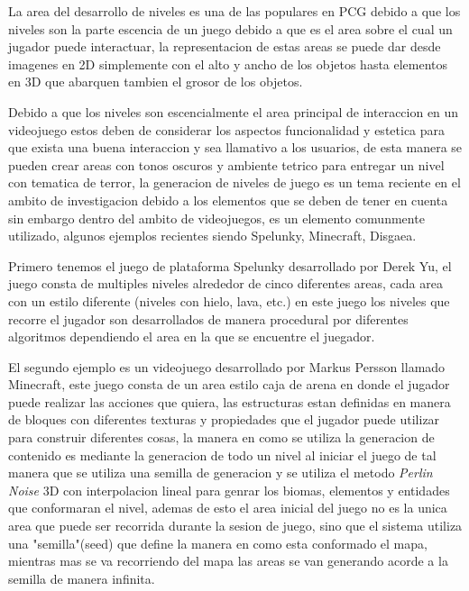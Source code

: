 La area del desarrollo de niveles es una de las populares en PCG debido a que
los niveles son la parte escencia de un juego debido a que es el area sobre el
cual un jugador puede interactuar, la representacion de estas areas se puede dar
desde imagenes en 2D simplemente con el alto y ancho de los objetos hasta
elementos en 3D que abarquen tambien el grosor de los objetos.

Debido a que los niveles son escencialmente el area principal de interaccion en
un videojuego estos deben de considerar los aspectos funcionalidad y estetica
para que exista una buena interaccion y sea llamativo a los usuarios, de esta
manera se pueden crear areas con tonos oscuros y ambiente tetrico para entregar
un nivel con tematica de terror, la generacion de niveles de juego es un tema
reciente en el ambito de investigacion debido a los elementos que se deben de
tener en cuenta sin embargo dentro del ambito de videojuegos, es un elemento
comunmente utilizado, algunos ejemplos recientes siendo Spelunky, Minecraft,
Disgaea.

Primero tenemos el juego de plataforma Spelunky desarrollado por Derek Yu, el
juego consta de multiples niveles alrededor de cinco diferentes areas, cada area
con un estilo diferente (niveles con hielo, lava, etc.) en este juego los niveles
que recorre el jugador son desarrollados de manera procedural por diferentes
algoritmos dependiendo el area en la que se encuentre el juegador.

El segundo ejemplo es un videojuego desarrollado por Markus Persson llamado
Minecraft, este juego consta de un area estilo caja de arena en donde el jugador
puede realizar las acciones que quiera, las estructuras estan definidas en
manera de bloques con diferentes texturas y propiedades que el jugador puede
utilizar para construir diferentes cosas, la manera en como se utiliza la
generacion de contenido es mediante la generacion de todo un nivel al iniciar el
juego de tal manera que se utiliza una semilla de generacion y se utiliza el
metodo \textit{Perlin Noise} 3D con interpolacion lineal para genrar los biomas,
elementos y entidades que conformaran el nivel, ademas de esto el area inicial
del juego no es la unica area que puede ser recorrida durante la sesion de
juego, sino que el sistema utiliza una "semilla"(seed) que define la manera en
como esta conformado el mapa, mientras mas se va recorriendo del mapa las areas
se van generando acorde a la semilla de manera infinita.

